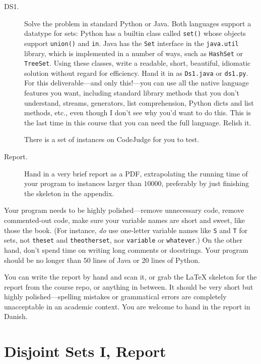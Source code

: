 \documentclass{tufte-handout}
\begin{document}
\begin{description}
  \item[DS1.]
    Solve the problem in standard Python or Java.
    Both languages support a datatype for sets:
    Python has a builtin class called \texttt{set()} whose objects support \texttt{union()} and \texttt{in}.
    Java has the \texttt{Set} interface in the \texttt{java.util} library, which is implemented in a number of ways, such as \texttt{HashSet} or \texttt{TreeSet}.
    Using these classes, write a readable, short, beautiful, idiomatic solution without regard for efficiency.
    Hand it in as \texttt{Ds1.java} or \texttt{ds1.py}.
    For this deliverable---and only this!---you can use all the native language features you want, including standard library methods that you don't understand, streams, generators, list comprehension, Python dicts and list methods, etc., even though I don't see why you'd want to do this.
    This is the last time in this course that you can need the full language.
    Relish it.
    
    There is a set of instances on CodeJudge for you to test.
  \item[Report.]
    Hand in a very brief report as a PDF, extrapolating the running time of your program to instances larger than $10000$, preferably by just finishing the skeleton in the appendix. 
\end{description}

Your program needs to be highly polished---remove unnecessary code, remove commented-out code, make sure your variable names are short and sweet, like those the book.
(For instance, \emph{do} use one-letter variable names like \texttt{S} and \texttt{T} for sets, not \texttt{theset} and \texttt{theotherset}, nor \texttt{variable} or \texttt{whatever}.)
On the other hand, don't spend time on writing long comments or docstrings.
Your program should be no longer than 50 lines of Java or 20 lines of Python.


You can write the report by hand and scan it, or grab the LaTeX skeleton for the report from the course repo, or anything in between.
It should be very short but highly polished---spelling mistakes or grammatical errors are completely unacceptable in an academic context.
You are welcome to hand in the report in Danish.

\newpage
\section{Disjoint Sets I, Report}
\end{document}
